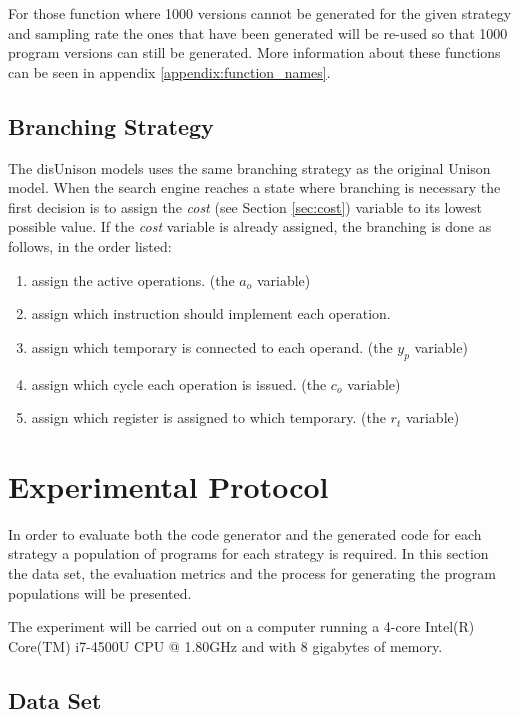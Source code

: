 For those function where 1000 versions cannot be generated for the given strategy and
sampling rate the ones that have been generated will be re-used so that 1000 program
versions can still be generated. More information about these functions can be seen in
appendix \ref{appendix:function_names}.

\subsection{Branching Strategy}
\label{sec:branch_strategy}

The disUnison models uses the same branching strategy as the original Unison model. When
the search engine reaches a state where branching is necessary the first decision is to
assign the \textit{cost} (see Section \ref{sec:cost}) variable to its lowest possible
value. If the \textit{cost} variable is already assigned, the branching is done as
follows, in the order listed:

\begin{enumerate}
	\item assign the active operations. (the $a_o$ variable)
	\item assign which instruction should implement each operation.
	\item assign which temporary is connected to each operand. (the $y_p$ variable)
	\item assign which cycle each operation is issued. (the $c_o$ variable)
	\item assign which register is assigned to which temporary. (the $r_t$ variable)
\end{enumerate}

\section{Experimental Protocol}

In order to evaluate both the code generator and the generated code for each strategy a
population of programs for each strategy is required. In this section the data set, the
evaluation metrics and the process for generating the program populations will be
presented.

The experiment will be carried out on a computer running a 4-core Intel(R) Core(TM)
i7-4500U CPU @ 1.80GHz and with 8 gigabytes of memory.

\subsection{Data Set}


